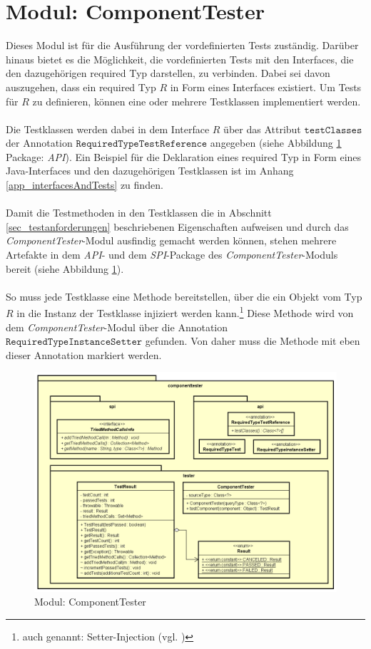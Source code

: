 \section{Modul: ComponentTester}\label{sec_Impl_CT}
Dieses Modul ist für die Ausführung der vordefinierten Tests zuständig. Darüber hinaus bietet es die Möglichkeit, die vordefinierten Tests mit den Interfaces, die den dazugehörigen required Typ darstellen, zu verbinden. Dabei sei davon auszugehen, dass ein required Typ $R$ in Form eines Interfaces existiert. Um Tests für $R$ zu definieren, können eine oder mehrere Testklassen implementiert werden.
\\\\
Die Testklassen werden dabei in dem Interface $R$ über das Attribut $\texttt{testClasses}$ der Annotation $\texttt{RequiredTypeTestReference}$ angegeben (siehe Abbildung \ref{fig_cdCompTester} Package: \emph{API}). Ein Beispiel für die Deklaration eines required Typ in Form eines Java-Interfaces und den dazugehörigen Testklassen ist im Anhang \ref{app_interfacesAndTests} zu finden.
\\\\
Damit die Testmethoden in den Testklassen die in Abschnitt \ref{sec_testanforderungen} beschriebenen Eigenschaften aufweisen und durch das \emph{ComponentTester}-Modul ausfindig gemacht werden können, stehen mehrere Artefakte in dem \emph{API}- und dem \emph{SPI}-Package des \emph{ComponentTester}-Moduls bereit (siehe Abbildung \ref{fig_cdCompTester}).
\\\\
So muss jede Testklasse eine Methode bereitstellen, über die ein Objekt vom Typ $R$ in die Instanz der Testklasse injiziert werden kann.\footnote{auch genannt: Setter-Injection (vgl. \cite{setterinjection})} Diese Methode wird von dem \emph{ComponentTester}-Modul über die Annotation $\texttt{RequiredTypeInstanceSetter}$ gefunden. Von daher muss die Methode mit eben dieser Annotation markiert werden.
\begin{figure}[h!]
\centering
\includegraphics[scale=0.6]{pics/cd_ComponentTester.png}
\caption{Modul: ComponentTester}
\label{fig_cdCompTester}
\end{figure}
